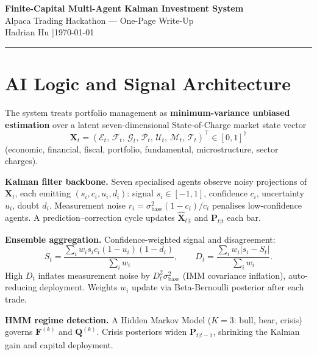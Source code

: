 \documentclass[7pt,letterpaper]{article}
\begin{document}
\begin{center}
  {\bfseries Finite-Capital Multi-Agent Kalman Investment System}\\[2pt]
  {\large Alpaca Trading Hackathon --- One-Page Write-Up}\\[1pt]
  {\normalsize Hadrian Hu \quad|\quad \today}
\end{center}

\vspace{-2pt}\hrule\vspace{4pt}

\section{AI Logic and Signal Architecture}

The system treats portfolio management as \textbf{minimum-variance unbiased estimation} over a latent seven-dimensional State-of-Charge market state vector
\begin{equation}
  \mathbf{X}_t = (\mathcal{E}_t,\,\mathcal{F}_t,\,\mathcal{G}_t,\,\mathcal{P}_t,\,\mathcal{U}_t,\,\mathcal{M}_t,\,\mathcal{T}_t)^\top \in [0,1]^7
\end{equation}
(economic, financial, fiscal, portfolio, fundamental, microstructure, sector charges).

\textbf{Kalman filter backbone.} Seven specialised agents observe noisy projections of $\mathbf{X}_t$, each emitting $(s_i, c_i, u_i, d_i)$: signal $s_i\!\in\![-1,1]$, confidence $c_i$, uncertainty $u_i$, doubt $d_i$. Measurement noise $r_i = \sigma_{\text{base}}^2(1-c_i)/c_i$ penalises low-confidence agents. A prediction--correction cycle updates $\hat{\mathbf{X}}_{t|t}$ and $\mathbf{P}_{t|t}$ each bar.

\textbf{Ensemble aggregation.} Confidence-weighted signal and disagreement:
\begin{equation}
  S_t = \frac{\sum_i w_i s_i c_i(1-u_i)(1-d_i)}{\sum_i w_i},\qquad D_t = \frac{\sum_i w_i |s_i - S_t|}{\sum_i w_i}.
\end{equation}
High $D_t$ inflates measurement noise by $D_t^2\sigma_{\text{base}}^2$ (IMM covariance inflation), auto-reducing deployment. Weights $w_i$ update via Beta-Bernoulli posterior after each trade.

\textbf{HMM regime detection.} A Hidden Markov Model ($K{=}3$: bull, bear, crisis) governs $\mathbf{F}^{(k)}$ and $\mathbf{Q}^{(k)}$. Crisis posteriors widen $\mathbf{P}_{t|t-1}$, shrinking the Kalman gain and capital deployment.
\end{document}

